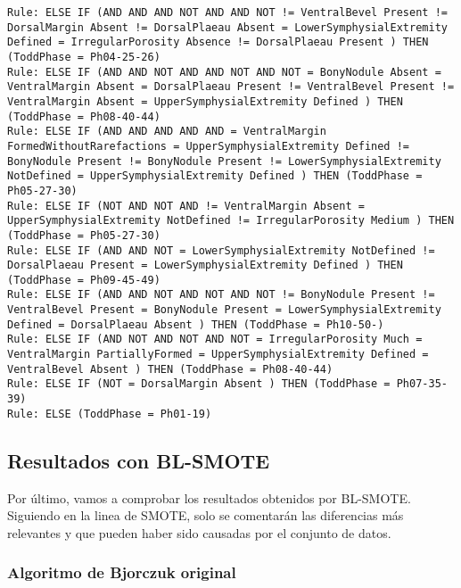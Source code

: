 \begin{lstlisting}
Rule: ELSE IF (AND AND AND NOT AND AND NOT != VentralBevel Present != DorsalMargin Absent != DorsalPlaeau Absent = LowerSymphysialExtremity Defined = IrregularPorosity Absence != DorsalPlaeau Present ) THEN (ToddPhase = Ph04-25-26)
Rule: ELSE IF (AND AND NOT AND AND NOT AND NOT = BonyNodule Absent = VentralMargin Absent = DorsalPlaeau Present != VentralBevel Present != VentralMargin Absent = UpperSymphysialExtremity Defined ) THEN (ToddPhase = Ph08-40-44)
Rule: ELSE IF (AND AND AND AND AND = VentralMargin FormedWithoutRarefactions = UpperSymphysialExtremity Defined != BonyNodule Present != BonyNodule Present != LowerSymphysialExtremity NotDefined = UpperSymphysialExtremity Defined ) THEN (ToddPhase = Ph05-27-30)
Rule: ELSE IF (NOT AND NOT AND != VentralMargin Absent = UpperSymphysialExtremity NotDefined != IrregularPorosity Medium ) THEN (ToddPhase = Ph05-27-30)
Rule: ELSE IF (AND AND NOT = LowerSymphysialExtremity NotDefined != DorsalPlaeau Present = LowerSymphysialExtremity Defined ) THEN (ToddPhase = Ph09-45-49)
Rule: ELSE IF (AND AND NOT AND NOT AND NOT != BonyNodule Present != VentralBevel Present = BonyNodule Present = LowerSymphysialExtremity Defined = DorsalPlaeau Absent ) THEN (ToddPhase = Ph10-50-)
Rule: ELSE IF (AND NOT AND NOT AND NOT = IrregularPorosity Much = VentralMargin PartiallyFormed = UpperSymphysialExtremity Defined = VentralBevel Absent ) THEN (ToddPhase = Ph08-40-44)
Rule: ELSE IF (NOT = DorsalMargin Absent ) THEN (ToddPhase = Ph07-35-39)
Rule: ELSE (ToddPhase = Ph01-19)
\end{lstlisting}

\newpage


\subsection{Resultados con BL-SMOTE}

Por último, vamos a comprobar los resultados obtenidos por BL-SMOTE. Siguiendo en la linea de SMOTE, solo se comentarán las diferencias más relevantes y que pueden haber sido causadas por el conjunto de datos.

\subsubsection{Algoritmo de Bjorczuk original}


